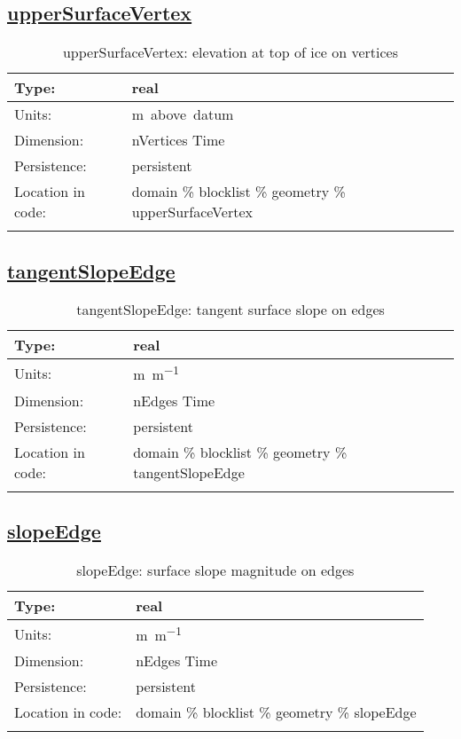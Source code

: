 \subsection[upperSurfaceVertex]{\hyperref[sec:var_tab_geometry]{upperSurfaceVertex}}
\label{subsec:var_sec_geometry_upperSurfaceVertex}
\begin{center}
\begin{longtable}{| p{2.0in} | p{4.0in} |}
        \hline 
        Type: & real \\
        \hline 
        Units: & \si{m.above.datum} \\
        \hline 
        Dimension: & nVertices Time \\
        \hline 
        Persistence: & persistent \\
        \hline 
         Location in code: & domain \% blocklist \% geometry \% upperSurfaceVertex \\
         \hline 
    \caption{upperSurfaceVertex: elevation at top of ice on vertices}
\end{longtable}
\end{center}
\subsection[tangentSlopeEdge]{\hyperref[sec:var_tab_geometry]{tangentSlopeEdge}}
\label{subsec:var_sec_geometry_tangentSlopeEdge}
\begin{center}
\begin{longtable}{| p{2.0in} | p{4.0in} |}
        \hline 
        Type: & real \\
        \hline 
        Units: & \si{m.m^{-1}} \\
        \hline 
        Dimension: & nEdges Time \\
        \hline 
        Persistence: & persistent \\
        \hline 
         Location in code: & domain \% blocklist \% geometry \% tangentSlopeEdge \\
         \hline 
    \caption{tangentSlopeEdge: tangent surface slope on edges}
\end{longtable}
\end{center}
\subsection[slopeEdge]{\hyperref[sec:var_tab_geometry]{slopeEdge}}
\label{subsec:var_sec_geometry_slopeEdge}
\begin{center}
\begin{longtable}{| p{2.0in} | p{4.0in} |}
        \hline 
        Type: & real \\
        \hline 
        Units: & \si{m.m^{-1}} \\
        \hline 
        Dimension: & nEdges Time \\
        \hline 
        Persistence: & persistent \\
        \hline 
         Location in code: & domain \% blocklist \% geometry \% slopeEdge \\
         \hline 
    \caption{slopeEdge: surface slope magnitude on edges}
\end{longtable}
\end{center}
